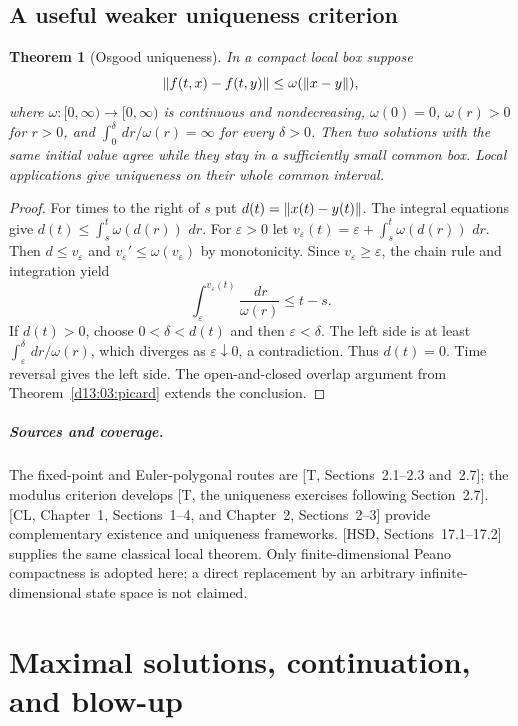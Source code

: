 \documentclass[11pt,oneside]{book}
\newtheorem{theorem}{Theorem}[chapter]
\theoremstyle{definition}
\theoremstyle{remark}\newtheorem{remark}[theorem]{Remark}
\newcommand{\dd}{\,d}\newcommand{\id}{\operatorname{id}}
\begin{document}
\section{A useful weaker uniqueness criterion}
\begin{theorem}[Osgood uniqueness]\label{d13:03:osgood}
In a compact local box suppose
\[
 \lVert f(t,x)-f(t,y)\rVert\leq\omega(\lVert x-y\rVert),
\]
where $\omega:[0,\infty)\to[0,\infty)$ is continuous and
nondecreasing, $\omega(0)=0$, $\omega(r)>0$ for $r>0$, and
$\int_0^\delta \dd r/\omega(r)=\infty$ for every $\delta>0$.
Then two solutions with the same initial value agree while they stay
in a sufficiently small common box. Local applications give uniqueness
on their whole common interval.
\end{theorem}
\begin{proof}
For times to the right of $s$ put $d(t)=\lVert x(t)-y(t)\rVert$. The
integral equations give $d(t)\leq\int_s^t\omega(d(r))\,\dd r$.
For $\varepsilon>0$ let
$v_\varepsilon(t)=\varepsilon+\int_s^t\omega(d(r))\,\dd r$.
Then $d\leq v_\varepsilon$ and
$v_\varepsilon'\leq\omega(v_\varepsilon)$ by monotonicity. Since
$v_\varepsilon\geq\varepsilon$, the chain rule and integration yield
\[
 \int_\varepsilon^{v_\varepsilon(t)}
       \frac{\dd r}{\omega(r)}\leq t-s.
\]
If $d(t)>0$, choose $0<\delta<d(t)$ and then $\varepsilon<\delta$.
The left side is at least $\int_\varepsilon^\delta\dd r/\omega(r)$,
which diverges as $\varepsilon\downarrow0$, a contradiction. Thus
$d(t)=0$. Time reversal gives the left side. The open-and-closed overlap
argument from Theorem~\ref{d13:03:picard} extends the conclusion.
\end{proof}

\paragraph{Sources and coverage.}
The fixed-point and Euler-polygonal routes are [T, Sections~2.1--2.3
and~2.7]; the modulus criterion develops [T, the uniqueness exercises
following Section~2.7]. [CL, Chapter~1, Sections~1--4, and Chapter~2,
Sections~2--3] provide complementary existence and uniqueness frameworks.
[HSD, Sections~17.1--17.2] supplies the same classical local theorem.
Only finite-dimensional Peano compactness is adopted here; a direct
replacement by an arbitrary infinite-dimensional state space is not claimed.



\chapter{Maximal solutions, continuation, and blow-up}\label{ch:d13-04}
\end{document}

